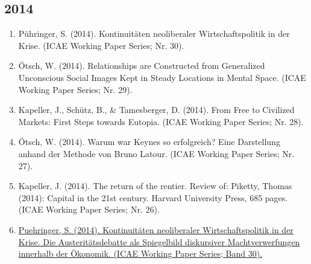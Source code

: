 \subsection*{2014}
\begin{enumerate}
	 \item Pühringer, S. (2014). Kontinuitäten neoliberaler Wirtschaftspolitik in der Krise. (ICAE Working Paper Series; Nr. 30).
	 \item Ötsch, W. (2014). Relationships are Constructed from Generalized Unconscious Social Images Kept in Steady Locations in Mental Space. (ICAE Working Paper Series; Nr. 29).
	 \item Kapeller, J., Schütz, B., \& Tamesberger, D. (2014). From Free to Civilized Markets: First Steps towards Eutopia. (ICAE Working Paper Series; Nr. 28).
	 \item Ötsch, W. (2014). Warum war Keynes so erfolgreich? Eine Darstellung anhand der Methode von Bruno Latour. (ICAE Working Paper Series; Nr. 27).
	 \item Kapeller, J. (2014). The return of the rentier. Review of: Piketty, Thomas (2014): Capital in the 21st century. Harvard University Press, 685 pages. (ICAE Working Paper Series; Nr. 26).
	 \item \href{https://doi.org/10.13140/RG.2.1.2658.4804}{Puehringer, S. (2014). Kontinuitäten neoliberaler Wirtschaftspolitik in der Krise. Die Austeritätsdebatte als Spiegelbild diskursiver Machtverwerfungen innerhalb der Ökonomik. (ICAE Working Paper Series; Band 30).}
\end{enumerate}
